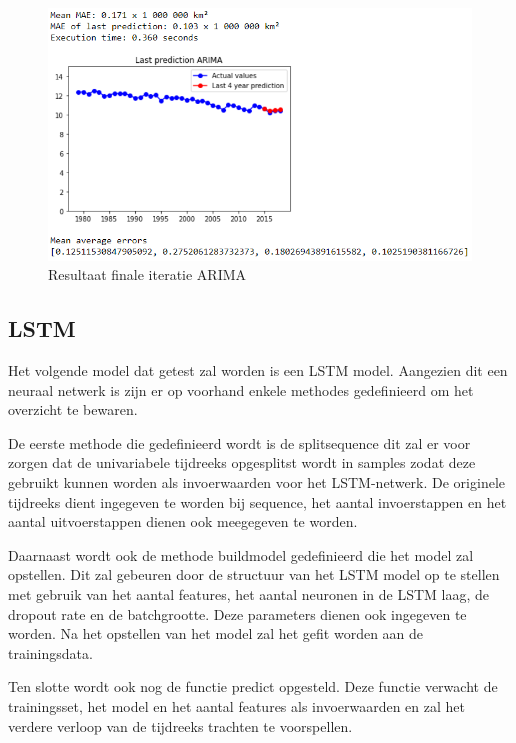\begin{figure}[!h]
    \centering
    \caption{Resultaat finale iteratie ARIMA}
    \label{fig:uvnsarima}
    \includegraphics[width=1\linewidth]{uv_ns_ARIMA}
\end{figure}

\clearpage
\subsection{LSTM}

Het volgende model dat getest zal worden is een LSTM model. Aangezien dit een neuraal netwerk is zijn er op voorhand enkele methodes gedefinieerd om het overzicht te bewaren. 

De eerste methode die gedefinieerd wordt is de split\textunderscore sequence dit zal er voor zorgen dat de univariabele tijdreeks opgesplitst wordt in samples zodat deze gebruikt kunnen worden als invoerwaarden voor het LSTM-netwerk. De originele tijdreeks dient ingegeven te worden bij sequence, het aantal invoerstappen en het aantal uitvoerstappen dienen ook meegegeven te worden.

Daarnaast wordt ook de methode build\textunderscore model gedefinieerd die het model zal opstellen. Dit zal gebeuren door de structuur van het LSTM model op te stellen met gebruik van het aantal features, het aantal neuronen in de LSTM laag, de dropout rate en de batchgrootte. Deze parameters dienen ook ingegeven te worden. Na het opstellen van het model zal het gefit worden aan de trainingsdata.

Ten slotte wordt ook nog de functie predict opgesteld. Deze functie verwacht de trainingsset, het model en het aantal features als invoerwaarden en zal het verdere verloop van de tijdreeks trachten te voorspellen. 

